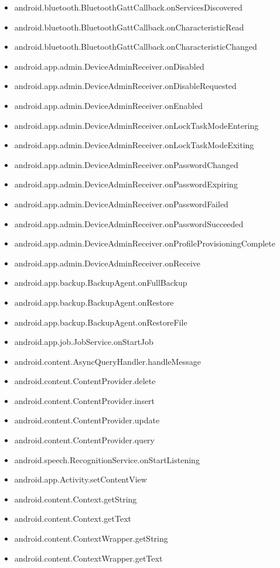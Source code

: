 \documentclass{sig-alternate}
\begin{document}
\begin{itemize}
\item android.bluetooth.BluetoothGattCallback.onServicesDiscovered
\item android.bluetooth.BluetoothGattCallback.onCharacteristicRead
\item android.bluetooth.BluetoothGattCallback.onCharacteristicChanged
\item android.app.admin.DeviceAdminReceiver.onDisabled
\item android.app.admin.DeviceAdminReceiver.onDisableRequested
\item android.app.admin.DeviceAdminReceiver.onEnabled
\item android.app.admin.DeviceAdminReceiver.onLockTaskModeEntering
\item android.app.admin.DeviceAdminReceiver.onLockTaskModeExiting
\item android.app.admin.DeviceAdminReceiver.onPasswordChanged
\item android.app.admin.DeviceAdminReceiver.onPasswordExpiring
\item android.app.admin.DeviceAdminReceiver.onPasswordFailed
\item android.app.admin.DeviceAdminReceiver.onPasswordSucceeded
\item android.app.admin.DeviceAdminReceiver.onProfileProvisioningComplete
\item android.app.admin.DeviceAdminReceiver.onReceive
\item android.app.backup.BackupAgent.onFullBackup
\item android.app.backup.BackupAgent.onRestore
\item android.app.backup.BackupAgent.onRestoreFile
\item android.app.job.JobService.onStartJob
\item android.content.AsyncQueryHandler.handleMessage
\item android.content.ContentProvider.delete
\item android.content.ContentProvider.insert
\item android.content.ContentProvider.update
\item android.content.ContentProvider.query
\item android.speech.RecognitionService.onStartListening
\item android.app.Activity.setContentView
\item android.content.Context.getString
\item android.content.Context.getText
\item android.content.ContextWrapper.getString
\item android.content.ContextWrapper.getText

\end{itemize}
\end{document}
